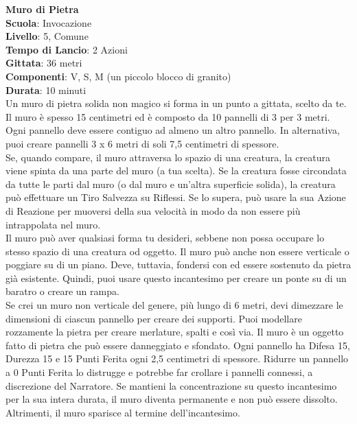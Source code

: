 \begin{multicols}{2}
\medskip\textbf{Muro di Pietra}\\
\textbf{Scuola}: Invocazione\\
\textbf{Livello}: 5, Comune\\
\textbf{Tempo di Lancio}: 2 Azioni\\
\textbf{Gittata}: 36 metri\\
\textbf{Componenti}: V, S, M (un piccolo blocco di granito)\\
\textbf{Durata}: 10 minuti\\
Un muro di pietra solida non magico si forma in un punto a gittata, scelto da te. Il muro è spesso 15 centimetri ed è composto da 10 pannelli di 3 per 3 metri. Ogni pannello deve essere contiguo ad almeno un altro pannello. In alternativa, puoi creare pannelli 3 x 6 metri di soli 7,5 centimetri di spessore.\\
Se, quando compare, il muro attraversa lo spazio di una creatura, la creatura viene spinta da una parte del muro (a tua scelta). Se la creatura fosse circondata da tutte le parti dal muro (o dal muro e un'altra superficie solida), la creatura può effettuare un Tiro Salvezza su Riflessi. Se lo supera, può usare la sua Azione di Reazione per muoversi della sua velocità in modo da non essere più intrappolata nel muro.\\
Il muro può aver qualsiasi forma tu desideri, sebbene non possa occupare lo stesso spazio di una creatura od oggetto. Il muro può anche non essere verticale o poggiare su di un piano. Deve, tuttavia, fondersi con ed essere sostenuto da pietra già esistente. Quindi, puoi usare questo incantesimo per creare un ponte su di un baratro o creare un rampa.\\
Se crei un muro non verticale del genere, più lungo di 6 metri, devi dimezzare le dimensioni di ciascun pannello per creare dei supporti. Puoi modellare rozzamente la pietra per creare merlature, spalti e così via. Il muro è un oggetto fatto di pietra che può essere danneggiato e sfondato. Ogni pannello ha Difesa 15, Durezza 15 e 15 Punti Ferita ogni 2,5 centimetri di spessore. Ridurre un pannello a 0 Punti Ferita lo distrugge e potrebbe far crollare i pannelli connessi, a discrezione del Narratore. Se mantieni la concentrazione su questo incantesimo per la sua intera durata, il muro diventa permanente e non può essere dissolto. Altrimenti, il muro sparisce al termine dell'incantesimo.


\end{multicols}
